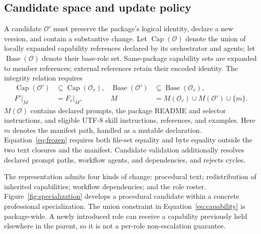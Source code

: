 \subsection{Candidate space and update policy}
A candidate $\mathcal O'$ must preserve the package's logical identity, declare a new version, and contain a substantive change. Let $\operatorname{Cap}(\mathcal O)$ denote the union of locally expanded capability references declared by its orchestrator and agents; let $\operatorname{Base}(\mathcal O)$ denote their base-role set. Same-package capability sets are expanded to member references; external references retain their encoded identity. The integrity relation requires
\begin{align}
\operatorname{Cap}(\mathcal O')&\subseteq\operatorname{Cap}(\mathcal O_v),
&
\operatorname{Base}(\mathcal O')&\subseteq\operatorname{Base}(\mathcal O_v),
\label{eq:capability}\\
F'|_{\overline{M}}&=F_v|_{\overline{M}},
&
M&=M(\mathcal O_v)\cup M(\mathcal O')\cup\{m\}.
\label{eq:frozen}
\end{align}
$M(\mathcal O)$ contains declared prompts, the package README and selector instructions, and eligible UTF-8 skill instructions, references, and examples. Here $m$ denotes the manifest path, handled as a mutable declaration. Equation~\ref{eq:frozen} requires both file-set equality and byte equality outside the two text closures and the manifest. Candidate validation additionally resolves declared prompt paths, workflow agents, and dependencies, and rejects cycles.

The representation admits four kinds of change: procedural text; redistribution of inherited capabilities; workflow dependencies; and the role roster. Figure~\ref{fig:specialization} develops a procedural candidate within a concrete professional specialization. The union constraint in Equation~\ref{eq:capability} is package-wide. A newly introduced role can receive a capability previously held elsewhere in the parent, so it is not a per-role non-escalation guarantee.

